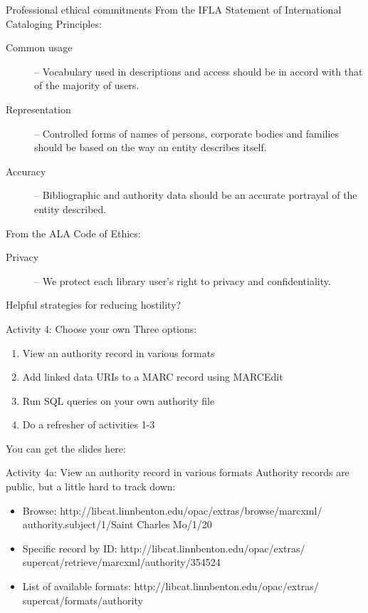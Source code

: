 \documentclass{beamer}
\begin{document}
\begin{frame}{Professional ethical commitments}
From the IFLA Statement of International Cataloging Principles:
 \begin{description}
  \item[Common usage] -- Vocabulary used in descriptions and access should be in accord with that 
of the majority of users. 
  \item[Representation] --  Controlled forms 
of  names  of  persons, 
corporate 
bodies  and  families  should  be  based  on  the  way  an  entity 
describes itself.
  \item[Accuracy] -- Bibliographic and authority data should be an accurate portrayal of 
the entity 
described.
 \end{description}
 
 From the ALA Code of Ethics:
 \begin{description}
  \item[Privacy] -- We protect each library user's right to privacy and confidentiality.
 \end{description}
 
 
\end{frame}

\begin{frame}{Helpful strategies for reducing hostility?}
\end{frame}




\begin{frame}{Activity 4: Choose your own}
Three options:
\begin{enumerate}
 \item View an authority record in various formats
 \item Add linked data URIs to a MARC record using MARCEdit
 \item Run SQL queries on your own authority file
 \item Do a refresher of activities 1-3
\end{enumerate}
You can get the slides here: 

\end{frame}

\begin{frame}{Activity 4a: View an authority record in various formats}
 Authority records are public, but a little hard to track down:
 \begin{itemize}
  \item Browse: http://libcat.linnbenton.edu/opac/extras/browse/marcxml/ authority.subject/1/Saint Charles Mo/1/20
  \item Specific record by ID: http://libcat.linnbenton.edu/opac/extras/ supercat/retrieve/marcxml/authority/354524
  \item List of available formats: http://libcat.linnbenton.edu/opac/extras/ supercat/formats/authority
 \end{itemize}

\end{frame}
\end{document}
